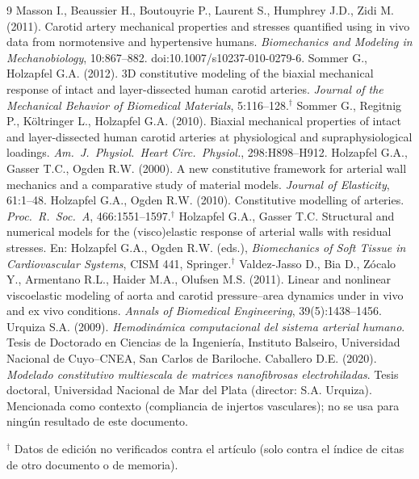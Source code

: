 \documentclass[11pt]{article}
\begin{document}
\begin{thebibliography}{9}\small
{} Masson I., Beaussier H., Boutouyrie P., Laurent S., Humphrey J.D., Zidi M. (2011). Carotid artery mechanical properties and stresses quantified using in vivo data from normotensive and hypertensive humans. \emph{Biomechanics and Modeling in Mechanobiology}, 10:867--882. doi:10.1007/s10237-010-0279-6.
 Sommer G., Holzapfel G.A. (2012). 3D constitutive modeling of the biaxial mechanical response of intact and layer-dissected human carotid arteries. \emph{Journal of the Mechanical Behavior of Biomedical Materials}, 5:116--128.$^\dagger$
 Sommer G., Regitnig P., Költringer L., Holzapfel G.A. (2010). Biaxial mechanical properties of intact and layer-dissected human carotid arteries at physiological and supraphysiological loadings. \emph{Am.\ J.\ Physiol.\ Heart Circ.\ Physiol.}, 298:H898--H912.
 Holzapfel G.A., Gasser T.C., Ogden R.W. (2000). A new constitutive framework for arterial wall mechanics and a comparative study of material models. \emph{Journal of Elasticity}, 61:1--48.
 Holzapfel G.A., Ogden R.W. (2010). Constitutive modelling of arteries. \emph{Proc.\ R.\ Soc.\ A}, 466:1551--1597.$^\dagger$
 Holzapfel G.A., Gasser T.C. Structural and numerical models for the (visco)elastic response of arterial walls with residual stresses. En: Holzapfel G.A., Ogden R.W. (eds.), \emph{Biomechanics of Soft Tissue in Cardiovascular Systems}, CISM 441, Springer.$^\dagger$
 Valdez-Jasso D., Bia D., Zócalo Y., Armentano R.L., Haider M.A., Olufsen M.S. (2011). Linear and nonlinear viscoelastic modeling of aorta and carotid pressure--area dynamics under in vivo and ex vivo conditions. \emph{Annals of Biomedical Engineering}, 39(5):1438--1456.
 Urquiza S.A. (2009). \emph{Hemodinámica computacional del sistema arterial humano}. Tesis de Doctorado en Ciencias de la Ingeniería, Instituto Balseiro, Universidad Nacional de Cuyo--CNEA, San Carlos de Bariloche.
 Caballero D.E. (2020). \emph{Modelado constitutivo multiescala de matrices nanofibrosas electrohiladas}. Tesis doctoral, Universidad Nacional de Mar del Plata (director: S.A. Urquiza). Mencionada como contexto (compliancia de injertos vasculares); no se usa para ningún resultado de este documento.
\end{thebibliography}
$^\dagger$ Datos de edición no verificados contra el artículo (solo contra el índice de citas de otro documento o de memoria).
\end{document}

